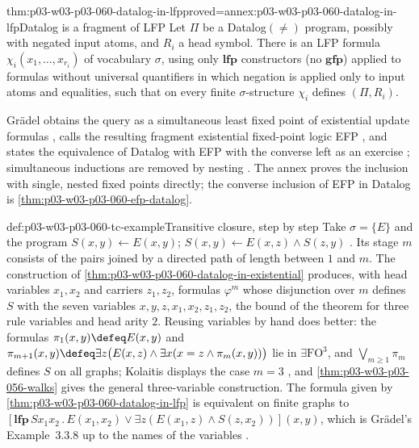 \begin{hbtheorem}{thm:p03-w03-p03-060-datalog-in-lfp}{proved=annex:p03-w03-p03-060-datalog-in-lfp}{Datalog is a fragment of LFP}
Let \(\Pi\) be a Datalog\((\neq)\) program, possibly with negated input
atoms, and \(R_i\) a head symbol. There is an LFP formula
\(\chi_i(x_1,\ldots,x_{r_i})\) of vocabulary \(\sigma\), using only
\(\mathbf{lfp}\) constructors (no \(\mathbf{gfp}\)) applied to formulas
without universal quantifiers in which negation is applied only to input
atoms and equalities, such that on every finite \(\sigma\)-structure
\(\chi_i\) defines \((\Pi,R_i)\).
\end{hbtheorem}

Gr\"adel obtains the query as a simultaneous least fixed point of
existential update formulas \cite[pp.~181--182]{Gradel2007FMTDescriptiveChapter},
calls the resulting fragment existential fixed-point logic EFP
\cite[Def.~3.3.63, p.~182]{Gradel2007FMTDescriptiveChapter}, and states
the equivalence of Datalog with EFP with the converse left as an exercise
\cite[Prop.~3.3.64, p.~182]{Gradel2007FMTDescriptiveChapter}; simultaneous
inductions are removed by nesting \cite[Lemma~3.3.41 and Thm.~3.3.42,
pp.~172--173]{Gradel2007FMTDescriptiveChapter}. The annex proves the
inclusion with single, nested fixed points directly; the converse
inclusion of EFP in Datalog is \cref{thm:p03-w03-p03-060-efp-datalog}.

\begin{hbexample}{def:p03-w03-p03-060-tc-example}{Transitive closure, step by step}
Take \(\sigma=\{E\}\) and the program
\(S(x,y)\leftarrow E(x,y)\); \(S(x,y)\leftarrow E(x,z)\wedge S(z,y)\)
\cite[Ex.~6.18, p.~42]{Kolaitis2003ExpressivePowerNotes}. Its stage
\(m\) consists of the pairs joined by a directed path of length between
\(1\) and \(m\). The construction of
\cref{thm:p03-w03-p03-060-datalog-in-existential} produces, with head
variables \(x_1,x_2\) and carriers \(z_1,z_2\), formulas \(\varphi^m\) whose
disjunction over \(m\) defines \(S\) with the seven variables
\(x,y,z,x_1,x_2,z_1,z_2\), the bound of the theorem for three rule
variables and head arity \(2\). Reusing variables by hand does
better: the formulas
\(\pi_1(x,y)\defeq E(x,y)\) and
\(\pi_{m+1}(x,y)\defeq\exists z\bigl(E(x,z)\wedge\exists x(x=z\wedge\pi_m(x,y))\bigr)\)
lie in \(\exists\mathrm{FO}^3\), and \(\bigvee_{m\ge1}\pi_m\) defines \(S\)
on all graphs; Kolaitis displays the case \(m=3\)
\cite[p.~70]{Kolaitis2003ExpressivePowerNotes}, and
\cref{thm:p03-w03-p03-056-walks} gives the general three-variable
construction. The formula given by
\cref{thm:p03-w03-p03-060-datalog-in-lfp} is equivalent on finite graphs to
\([\mathbf{lfp}\,S x_1x_2\,.\,E(x_1,x_2)\vee\exists z(E(x_1,z)\wedge S(z,x_2))](x,y)\),
which is Gr\"adel's Example~3.3.8 up to the names of the
variables \cite[p.~155]{Gradel2007FMTDescriptiveChapter}.
\end{hbexample}

